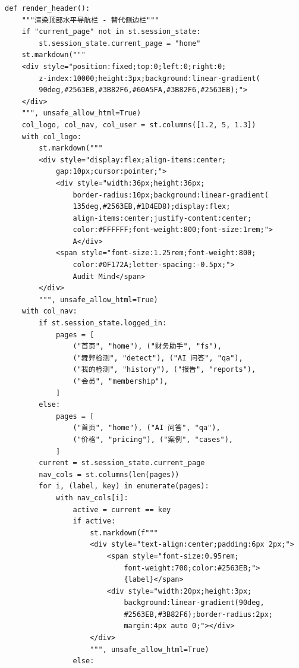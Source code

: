 \documentclass[a4paper,10pt]{article}
\begin{document}
\setcounter{page}{31}

\begin{lstlisting}
def render_header():
    """渲染顶部水平导航栏 - 替代侧边栏"""
    if "current_page" not in st.session_state:
        st.session_state.current_page = "home"
    st.markdown("""
    <div style="position:fixed;top:0;left:0;right:0;
        z-index:10000;height:3px;background:linear-gradient(
        90deg,#2563EB,#3B82F6,#60A5FA,#3B82F6,#2563EB);">
    </div>
    """, unsafe_allow_html=True)
    col_logo, col_nav, col_user = st.columns([1.2, 5, 1.3])
    with col_logo:
        st.markdown("""
        <div style="display:flex;align-items:center;
            gap:10px;cursor:pointer;">
            <div style="width:36px;height:36px;
                border-radius:10px;background:linear-gradient(
                135deg,#2563EB,#1D4ED8);display:flex;
                align-items:center;justify-content:center;
                color:#FFFFFF;font-weight:800;font-size:1rem;">
                A</div>
            <span style="font-size:1.25rem;font-weight:800;
                color:#0F172A;letter-spacing:-0.5px;">
                Audit Mind</span>
        </div>
        """, unsafe_allow_html=True)
    with col_nav:
        if st.session_state.logged_in:
            pages = [
                ("首页", "home"), ("财务助手", "fs"),
                ("舞弊检测", "detect"), ("AI 问答", "qa"),
                ("我的检测", "history"), ("报告", "reports"),
                ("会员", "membership"),
            ]
        else:
            pages = [
                ("首页", "home"), ("AI 问答", "qa"),
                ("价格", "pricing"), ("案例", "cases"),
            ]
        current = st.session_state.current_page
        nav_cols = st.columns(len(pages))
        for i, (label, key) in enumerate(pages):
            with nav_cols[i]:
                active = current == key
                if active:
                    st.markdown(f"""
                    <div style="text-align:center;padding:6px 2px;">
                        <span style="font-size:0.95rem;
                            font-weight:700;color:#2563EB;">
                            {label}</span>
                        <div style="width:20px;height:3px;
                            background:linear-gradient(90deg,
                            #2563EB,#3B82F6);border-radius:2px;
                            margin:4px auto 0;"></div>
                    </div>
                    """, unsafe_allow_html=True)
                else:

\end{lstlisting}
\end{document}
